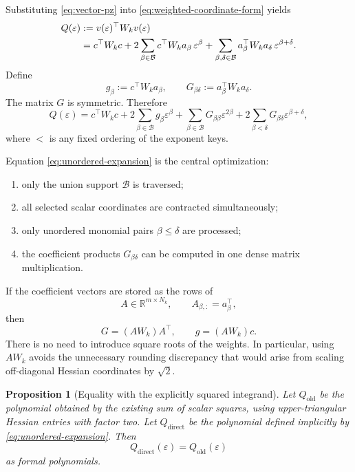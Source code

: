 \documentclass[11pt]{article}
\newtheorem{proposition}{Proposition}
\newcommand{\R}{\mathbb{R}}
\newcommand{\eps}{\varepsilon}
\begin{document}
Substituting \eqref{eq:vector-pz} into
\eqref{eq:weighted-coordinate-form} yields
\begin{align}
    Q(\eps)
    &:=
    v(\eps)^\top W_kv(\eps) \notag\\
    &=
    c^\top W_kc
    +2\sum_{\beta\in\mathcal{B}}
        c^\top W_ka_\beta\,\eps^\beta
    +\sum_{\beta,\delta\in\mathcal{B}}
        a_\beta^\top W_ka_\delta\,\eps^{\beta+\delta}.
    \label{eq:weighted-expansion}
\end{align}
Define
\begin{equation}
    g_\beta:=c^\top W_ka_\beta,
    \qquad
    G_{\beta\delta}:=a_\beta^\top W_ka_\delta.
    \label{eq:gram-definitions}
\end{equation}
The matrix \(G\) is symmetric.  Therefore
\begin{equation}
    Q(\eps)
    =
    c^\top W_kc
    +2\sum_{\beta\in\mathcal{B}}g_\beta\eps^\beta
    +\sum_{\beta\in\mathcal{B}}G_{\beta\beta}\eps^{2\beta}
    +2\sum_{\beta<\delta}G_{\beta\delta}\eps^{\beta+\delta},
    \label{eq:unordered-expansion}
\end{equation}
where \(<\) is any fixed ordering of the exponent keys.

Equation \eqref{eq:unordered-expansion} is the central optimization:
\begin{enumerate}[label=\arabic*.]
    \item only the union support \(\mathcal{B}\) is traversed;
    \item all selected scalar coordinates are contracted simultaneously;
    \item only unordered monomial pairs \(\beta\leq\delta\) are processed;
    \item the coefficient products \(G_{\beta\delta}\) can be computed in one
    dense matrix multiplication.
\end{enumerate}

If the coefficient vectors are stored as the rows of
\[
    A\in\R^{m\times N_k},
    \qquad
    A_{\beta,:}=a_\beta^\top,
\]
then
\begin{equation}
    G=(AW_k)A^\top,
    \qquad
    g=(AW_k)c.
    \label{eq:batched-gram}
\end{equation}
There is no need to introduce square roots of the weights.  In particular,
using \(AW_k\) avoids the unnecessary rounding discrepancy that would arise
from scaling off-diagonal Hessian coordinates by \(\sqrt{2}\).

\begin{proposition}[Equality with the explicitly squared integrand]
\label{prop:integrand-equality}
Let \(Q_{\mathrm{old}}\) be the polynomial obtained by the existing sum of
scalar squares, using upper-triangular Hessian entries with factor two.
Let \(Q_{\mathrm{direct}}\) be the polynomial defined implicitly by
\eqref{eq:unordered-expansion}.  Then
\[
    Q_{\mathrm{direct}}(\eps)=Q_{\mathrm{old}}(\eps)
\]
as formal polynomials.
\end{proposition}
\end{document}

